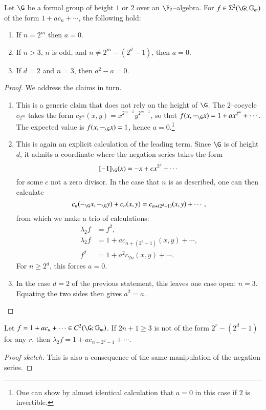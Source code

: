 \begin{lemma}\label{SigmaNonexistenceLemma}
Let $\G$ be a formal group of height $1$ or $2$ over an $\F_2$--algebra.  For $f \in \Sigma^2(\G; \Gm)$ of the form $1 + a c_n + \cdots$, the following hold:
\begin{enumerate}
    \item If $n = 2^m$ then $a = 0$.
    \item If $n > 3$, $n$ is odd, and $n \ne 2^m - (2^d - 1)$, then $a = 0$.
    \item If $d = 2$ and $n = 3$, then $a^2 - a = 0$.
\end{enumerate}
\end{lemma}
\begin{proof}
We address the claims in turn.
\begin{enumerate}
    \item This is a generic claim that does not rely on the height of $\G$.  The $2$--cocycle $c_{2^m}$ takes the form $c_{2^m}(x, y) = x^{2^{m-1}} y^{2^{m-1}}$, so that $f(x, -_{\G} x) = 1 + a x^{2^m} + \cdots$.  The expected value is $f(x, -_{\G} x) = 1$, hence $a = 0$.\footnote{One can show by almost identical calculation that $a = 0$ in this case if $2$ is invertible.}
    \item This is again an explicit calculation of the leading term.  Since $\G$ is of height $d$, it admits a coordinate where the negation series takes the form \[[-1]_{\G}(x) = -x + cx^{2^d} + \cdots\] for some $c$ not a zero divisor.  In the case that $n$ is as described, one can then calculate \[c_n(-_{\G} x, -_{\G} y) + c_n(x, y) = c_{n + (2^d-1)}(x, y) + \cdots,\] from which we make a trio of calculations:
    \begin{align*}
    \lambda_2 f & = f^2, \tag{uses $f \in \Sigma^2(\G; \Gm)$} \\
    \lambda_2 f & = 1 + ac_{n + (2^d-1)}(x, y) + \cdots, \tag{above observation} \\
    f^2 & = 1 + a^2 c_{2n}(x, y) + \cdots. \tag{characteristic $2$}
    \end{align*}
    For $n \ge 2^d$, this forces $a = 0$.
    \item In the case $d = 2$ of the previous statement, this leaves one case open: $n = 3$.  Equating the two sides then gives $a^2 = a$.
    \qedhere
\end{enumerate}
\end{proof}

\begin{lemma}\label{SigmaArrowLemma}
Let $f = 1 + a c_n + \cdots \in C^2(\G; \Gm)$.  If $2n+1 \ge 3$ is not of the form $2^r - (2^d - 1)$ for any $r$, then $\lambda_2 f = 1 + a c_{n + 2^d - 1} + \cdots$.
\end{lemma}
\begin{proof}[Proof sketch]
This is also a consequence of the same manipulation of the negation series.
\end{proof}

